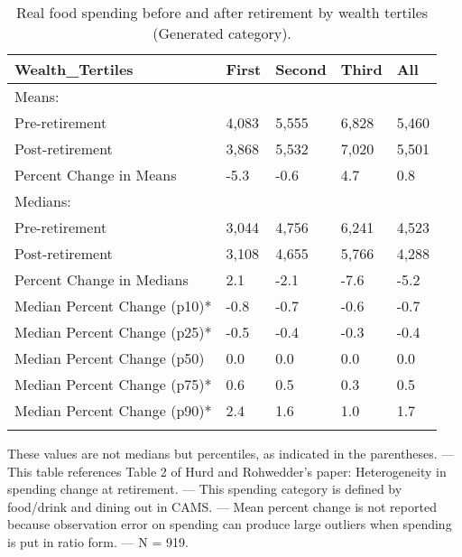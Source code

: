 \begin{table}[tbp] \centering
{}

\caption{Real food spending before and after retirement by wealth tertiles (Generated category).}
\begin{tabularx}{\textwidth}{lCCCC}

\toprule
{Wealth\_Tertiles}&{First}&{Second}&{Third}&{All} \tabularnewline
\midrule\addlinespace[1.5ex]
Means:&&&& \tabularnewline
\midrule Pre-retirement&4,083&5,555&6,828&5,460 \tabularnewline
Post-retirement&3,868&5,532&7,020&5,501 \tabularnewline
Percent Change in Means&-5.3&-0.6&4.7&0.8 \tabularnewline
\midrule Medians:&&&& \tabularnewline
\midrule Pre-retirement&3,044&4,756&6,241&4,523 \tabularnewline
Post-retirement&3,108&4,655&5,766&4,288 \tabularnewline
Percent Change in Medians&2.1&-2.1&-7.6&-5.2 \tabularnewline
Median Percent Change (p10)*&-0.8&-0.7&-0.6&-0.7 \tabularnewline
Median Percent Change (p25)*&-0.5&-0.4&-0.3&-0.4 \tabularnewline
Median Percent Change (p50)&0.0&0.0&0.0&0.0 \tabularnewline
Median Percent Change (p75)*&0.6&0.5&0.3&0.5 \tabularnewline
Median Percent Change (p90)*&2.4&1.6&1.0&1.7 \tabularnewline
\bottomrule \addlinespace[1.5ex]

\end{tabularx}
\begin{flushleft}
\footnotesize *These values are not medians but percentiles, as indicated in the parentheses. \linebreak --- \linebreak This table references Table 2 of Hurd and Rohwedder's paper: Heterogeneity in spending change at retirement. \linebreak --- \linebreak This spending category is defined by food/drink and dining out in CAMS. \linebreak --- \linebreak Mean percent change is not reported because observation error on spending can produce large outliers when spending is put in ratio form. \linebreak --- \linebreak N = 919.
\end{flushleft}
\end{table}
